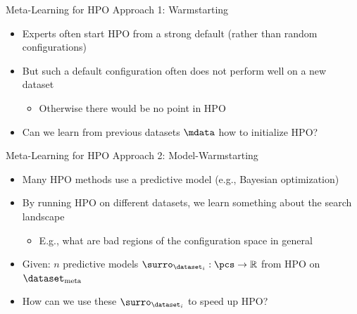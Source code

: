 \begin{frame}[c]{Meta-Learning for HPO Approach 1: Warmstarting}
	
\begin{itemize}
	\item Experts often start HPO from a strong default (rather than random configurations)
	\pause
	\item But such a default configuration often does not perform well on a new dataset
	\begin{itemize}
		\item Otherwise there would be no point in HPO
	\end{itemize}
	\pause
	\item \alert{Can we learn from previous datasets $\mdata$ how to initialize HPO?}\\
\end{itemize}

\end{frame}
\begin{frame}[c]{Meta-Learning for HPO Approach 2: Model-Warmstarting}

\begin{itemize}
	\item Many HPO methods use a predictive model (e.g., Bayesian optimization)
	\item By running HPO on different datasets,
	we learn something about the search landscape
	\begin{itemize}
		\item E.g., what are bad regions of the configuration space in general
	\end{itemize}
	\smallskip
	\item Given: $n$ predictive models $\surro_{\dataset_i}: \pcs \to \mathbb{R}$ from HPO on $\dataset_{\text{meta}}$	
	\item \alert{How can we use these $\surro_{\dataset_i}$ to speed up HPO?}
\end{itemize}


\end{frame}

